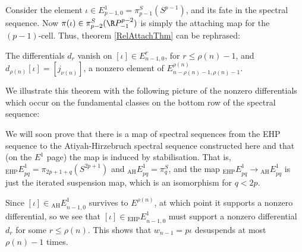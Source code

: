 Consider the element $\iota\in E^1_{p-1,0}=\pi^S_{p-1}(S^{p-1})$, and its fate in the spectral sequence. Now $\pi(\iota)\in \pi^S_{p-2}(\RP^{p-2}_{-1})$ is simply the attaching map for the $(p-1)$-cell. Thus, theorem \ref{RelAttachThm} can be rephrased:
\begin{thm}
The differentials $d_r$ vanish on $[\iota]\in E_{n-1,0}^r$, for $r\leq\rho(n)-1$, and $d_{\rho(n)}[\iota]=[j_{\nu(n)}]$, a nonzero element of $E^{\rho(n)}_{n-\rho(n)-1,\rho(n)-1}$.
\end{thm}
We illustrate this theorem with the following picture of the nonzero differentials which occur on the fundamental classes on the bottom row of the spectral sequence:
\begin{center}
\end{center}

We will soon prove that there is a map of spectral sequences from the EHP sequence to the Atiyah-Hirzebruch spectral sequence constructed here and that (on the $E^1$ page) the map is induced by stabilisation. That is, ${_\text{EHP}E}^1_{pq}=\pi_{2p+1+q}(S^{2p+1})$ and ${_\text{AH}E}^1_{pq}=\pi^S_q$, and the map ${_\text{EHP}E}^1_{pq}\to{_\text{AH}E}^1_{pq}$ is just the iterated suspension map, which is an isomorphism for $q<2p$.

Since $[\iota]\in {_\text{AH}E}^1_{n-1,0}$ survives to $E^{\rho(n)}$, at which point it supports a nonzero differential, so we see that $[\iota]\in {_\text{EHP}E}^1_{n-1,0}$ must support a nonzero differential $d_r$ for some $r\leq\rho(n)$. This shows that $w_{n-1}=p\iota$ desuspends at most $\rho(n)-1$ times.

